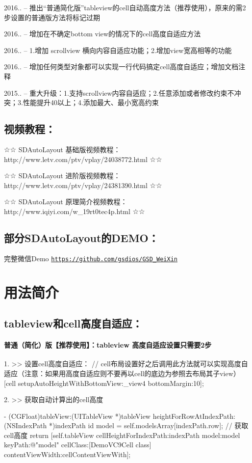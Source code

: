 2016.. -- 推出“普通简化版”tableview的cell自动高度方法（推荐使用），原来的需2步设置的普通版方法将标记过期

2016.. -- 增加在不确定bottom view的情况下的cell高度自适应方法

2016.. -- 1.增加 scrollview 横向内容自适应功能；2.\+增加view宽高相等的功能

2016.. -- 增加任何类型对象都可以实现一行代码搞定cell高度自适应；增加文档注释

2015.. -- 重大升级：1.\+支持scrollview内容自适应；2.\+任意添加或者修改约束不冲突；3.\+性能提升40以上；4.\+添加最大、最小宽高约束

\subsection*{视频教程：}

☆☆ S\+D\+Auto\+Layout 基础版视频教程：http\+://www.letv.\+com/ptv/vplay/24038772.html ☆☆

☆☆ S\+D\+Auto\+Layout 进阶版视频教程：http\+://www.letv.\+com/ptv/vplay/24381390.html ☆☆

☆☆ S\+D\+Auto\+Layout 原理简介视频教程：http\+://www.iqiyi.\+com/w\+\_\+19rt0tec4p.html ☆☆

\subsection*{部分\+S\+D\+Auto\+Layout的\+D\+E\+M\+O：}

完整微信\+Demo \href{https://github.com/gsdios/GSD_WeiXin}{\tt https\+://github.\+com/gsdios/\+G\+S\+D\+\_\+\+Wei\+Xin}



\section*{用法简介}

\subsection*{tableview和cell高度自适应：}

\paragraph*{普通（简化）版【推荐使用】：tableview 高度自适应设置只需要2步}

\begin{DoxyVerb}1. >> 设置cell高度自适应：
// cell布局设置好之后调用此方法就可以实现高度自适应（注意：如果用高度自适应则不要再以cell的底边为参照去布局其子view）
[cell setupAutoHeightWithBottomView:_view4 bottomMargin:10];

2. >> 获取自动计算出的cell高度

- (CGFloat)tableView:(UITableView *)tableView heightForRowAtIndexPath:(NSIndexPath *)indexPath
{
    id model = self.modelsArray[indexPath.row];
    // 获取cell高度
    return [self.tableView cellHeightForIndexPath:indexPath model:model keyPath:@"model" cellClass:[DemoVC9Cell class]  contentViewWidth:cellContentViewWith];
}
\end{DoxyVerb}


